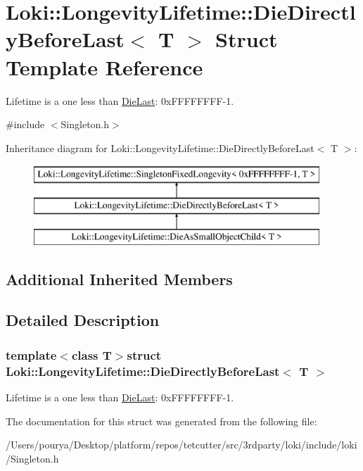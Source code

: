 \hypertarget{structLoki_1_1LongevityLifetime_1_1DieDirectlyBeforeLast}{}\section{Loki\+:\+:Longevity\+Lifetime\+:\+:Die\+Directly\+Before\+Last$<$ T $>$ Struct Template Reference}
\label{structLoki_1_1LongevityLifetime_1_1DieDirectlyBeforeLast}


Lifetime is a one less than \hyperlink{structLoki_1_1LongevityLifetime_1_1DieLast}{Die\+Last}\+: 0x\+F\+F\+F\+F\+F\+F\+F\+F-\/1.  




{\ttfamily \#include $<$Singleton.\+h$>$}

Inheritance diagram for Loki\+:\+:Longevity\+Lifetime\+:\+:Die\+Directly\+Before\+Last$<$ T $>$\+:\begin{figure}[H]
\begin{center}
\leavevmode
\includegraphics[height=3.000000cm]{structLoki_1_1LongevityLifetime_1_1DieDirectlyBeforeLast}
\end{center}
\end{figure}
\subsection*{Additional Inherited Members}


\subsection{Detailed Description}
\subsubsection*{template$<$class T$>$struct Loki\+::\+Longevity\+Lifetime\+::\+Die\+Directly\+Before\+Last$<$ T $>$}

Lifetime is a one less than \hyperlink{structLoki_1_1LongevityLifetime_1_1DieLast}{Die\+Last}\+: 0x\+F\+F\+F\+F\+F\+F\+F\+F-\/1. 

The documentation for this struct was generated from the following file\+:\begin{DoxyCompactItemize}
\item 
/\+Users/pourya/\+Desktop/platform/repos/tetcutter/src/3rdparty/loki/include/loki/Singleton.\+h\end{DoxyCompactItemize}
